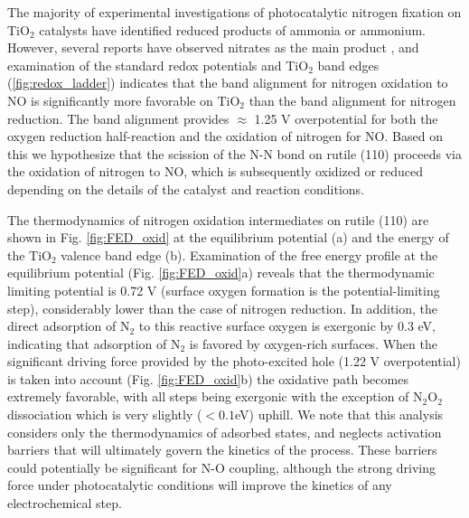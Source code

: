 \documentclass[journal=ascecg,manuscript=article,articletitle=true]{achemso}
\begin{document}
The majority of experimental investigations of photocatalytic nitrogen fixation on TiO$_2$ catalysts have identified reduced products of ammonia or ammonium. However, several reports have observed nitrates as the main product \cite{Bickley_1979, Yuan_2013}, and examination of the standard redox potentials and TiO$_2$ band edges (\ref{fig:redox_ladder}) indicates that the band alignment for nitrogen oxidation to NO is significantly more favorable on TiO$_2$ than the band alignment for nitrogen reduction. The band alignment provides $\approx$ 1.25 V overpotential for both the oxygen reduction half-reaction and the oxidation of nitrogen for NO. Based on this we hypothesize that the scission of the N-N bond on rutile (110) proceeds via the oxidation of nitrogen to NO, which is subsequently oxidized or reduced depending on the details of the catalyst and reaction conditions.

The thermodynamics of nitrogen oxidation intermediates on rutile (110) are shown in Fig. \ref{fig:FED_oxid} at the equilibrium potential (a) and the energy of the TiO$_2$ valence band edge (b). Examination of the free energy profile at the equilibrium potential (Fig. \ref{fig:FED_oxid}a) reveals that the thermodynamic limiting potential is 0.72 V (surface oxygen formation is the potential-limiting step), considerably lower than the case of nitrogen reduction. In addition, the direct adsorption of N$_2$ to this reactive surface oxygen is exergonic by 0.3 eV, indicating that adsorption of N$_2$ is favored by oxygen-rich surfaces. When the significant driving force provided by the photo-excited hole (1.22 V overpotential) is taken into account (Fig. \ref{fig:FED_oxid}b) the oxidative path becomes extremely favorable, with all steps being exergonic with the exception of N$_2$O$_2$ dissociation which is very slightly ($<0.1$eV) uphill. We note that this analysis considers only the thermodynamics of adsorbed states, and neglects activation barriers that will ultimately govern the kinetics of the process. These barriers could potentially be significant for N-O coupling, although the strong driving force under photocatalytic conditions will improve the kinetics of any electrochemical step.
\end{document}
